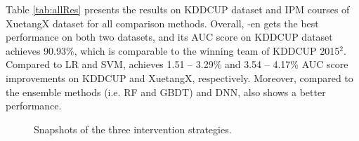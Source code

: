 	Table \ref{tab:allRes} presents the results on KDDCUP dataset and IPM courses of XuetangX dataset for all comparison methods. Overall, \modelname{}-en gets the best performance on both two datasets, and its AUC score on KDDCUP dataset achieves 90.93\%, which is comparable to the winning team of KDDCUP 2015$^2$.
	Compared to LR and SVM, \modelname{} achieves 1.51 -- 3.29\% and 3.54 -- 4.17\% AUC score improvements on KDDCUP  and XuetangX, respectively. Moreover, compared to the ensemble methods (i.e. RF and GBDT) and DNN, \modelname{} also shows a better performance. 

  	\begin{figure}
  	\centering
  	\caption{Snapshots of the three intervention strategies.} 
  	\label{fig:snapshot}
  \end{figure}
  
